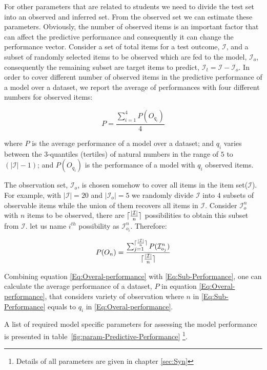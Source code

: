 For other parameters that are related to students we need to divide the test set into an observed and inferred set. From the observed set we can estimate these parameters. Obviously, the number of observed items is an important factor that can affect the predictive performance and consequently it can change the performance vector. Consider a set of total items for a test outcome, $\mathcal{I}$, and a subset of randomly selected items to be observed which are fed to the model, $\mathcal{I}_o$, consequently the remaining subset are target items to predict, $\mathcal{I}_t = \mathcal{I}-\mathcal{I}_o$. In order to cover different number of observed items in the predictive performance of a model over a dataset, we report the average of performances with four different numbers for observed items:

\begin{equation}
P = \frac{\sum_{i = 1}^{4}{P(O_{q_i})}}{4}
\label{Eq:Overal-performance}
\end{equation} 

 where $P$ is the average performance of a model over a dataset; and $q_i$ varies between the 3-quantiles (tertiles) of natural numbers in the range of $5$ to $(|\mathcal{I}|-1)$; and $P(O_{q_i})$ is the performance of a model with $q_i$ observed items.

The observation set, $\mathcal{I}_o$, is chosen somehow to cover all items in the item set($\mathcal{I}$). For example, with $|\mathcal{I}| = 20$ and  $|\mathcal{I}_o| = 5$ we randomly divide $\mathcal{I}$ into $4$ subsets of observable items while the union of them recovers all items in $\mathcal{I}$. Consider $\mathcal{I}_o^n$ with $n$ items to be observed, there are $\lceil\frac{|\mathcal{I}|}{n}\rceil$ possibilities to obtain this subset from $\mathcal{I}$. let us name $i^{th}$ possibility as $\mathcal{I}_{o_i}^n$. Therefore:

\begin{equation}
P(O_n) = \frac{\sum_{j = 1}^{\lceil\frac{|\mathcal{I}|}{n}\rceil}{P(\mathcal{I}_{o_j}^n)}}{\lceil\frac{|\mathcal{I}|}{n}\rceil}
\label{Eq:Sub-Performance}
\end{equation}

Combining equation \ref{Eq:Overal-performance} with \ref{Eq:Sub-Performance}, one can calculate the average performance of a dataset, $P$ in equation \ref{Eq:Overal-performance}, that considers variety of observation where $n$ in  \ref{Eq:Sub-Performance} equals to $q_i$ in \ref{Eq:Overal-performance}.

A list of required model specific parameters for assessing the model performance is presented in table~\ref{fig:param-Predictive-Performance} \footnote{Details of all parameters are given in chapter \ref{sec:Syn}}.

